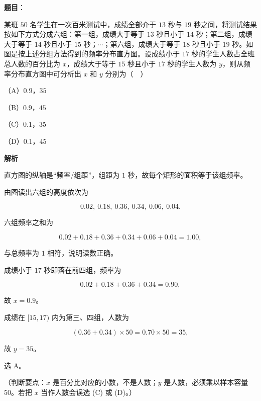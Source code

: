 \begin{answer}

\textbf{题目}：

某班 $50$ 名学生在一次百米测试中，成绩全部介于 $13$ 秒与 $19$ 秒之间，将测试结果按如下方式分成六组：第一组，成绩大于等于 $13$ 秒且小于 $14$ 秒；第二组，成绩大于等于 $14$ 秒且小于 $15$ 秒；$\cdots$；第六组，成绩大于等于 $18$ 秒且小于 $19$ 秒。如图是按上述分组方法得到的频率分布直方图。设成绩小于 $17$ 秒的学生人数占全班总人数的百分比为 $x$，成绩大于等于 $15$ 秒且小于 $17$ 秒的学生人数为 $y$，则从频率分布直方图中可分析出 $x$ 和 $y$ 分别为（　）
\nopagebreak[4]
\begin{center}\end{center}
\nopagebreak[4]
（A）$0.9$，$35$

（B）$0.9$，$45$

（C）$0.1$，$35$

（D）$0.1$，$45$

\textbf{解析}

直方图的纵轴是“频率/组距”，组距为 $1$ 秒，故每个矩形的面积等于该组频率。

由图读出六组的高度依次为

\nopagebreak[4]
\[0.02,\ 0.18,\ 0.36,\ 0.34,\ 0.06,\ 0.04.\]

六组频率之和为

\nopagebreak[4]
\[0.02+0.18+0.36+0.34+0.06+0.04=1.00,\]

与总频率为 $1$ 相符，说明读数正确。

成绩小于 $17$ 秒即落在前四组，频率为

\nopagebreak[4]
\[0.02+0.18+0.36+0.34=0.90,\]

故 $x=0.9$。

成绩在 $[15,17)$ 内为第三、四组，人数为

\nopagebreak[4]
\[(0.36+0.34)\times50=0.70\times50=35,\]

故 $y=35$。

选 A。

（判断要点：$x$ 是百分比对应的小数，不是人数；$y$ 是人数，必须乘以样本容量 $50$。若把 $x$ 当作人数会误选 (C) 或 (D)。）


\end{answer}
